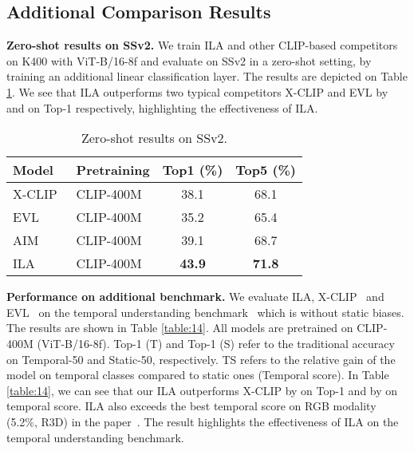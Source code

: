 \documentclass[10pt,twocolumn,letterpaper]{article}
\begin{document}
\subsection{Additional Comparison Results}

\noindent\textbf{Zero-shot results on SSv2.} We train ILA and other CLIP-based competitors on K400 with ViT-B/16-8f and evaluate on SSv2 in a zero-shot setting, by training an additional linear classification layer. The results are depicted on Table \ref{table:13}. We see that ILA outperforms two typical competitors X-CLIP and EVL by  and  on Top-1 respectively, highlighting the effectiveness of ILA.

\begin{table}[htbp]\small
  \caption{Zero-shot results on SSv2.}
  \begin{center}
  \renewcommand\arraystretch{1.2}
  \begin{tabular}{llcc}
    \toprule
    Model  & Pretraining   & Top1 (\%)      & Top5 (\%)      \\ \midrule
    X-CLIP~\cite{b24} & CLIP-400M & 38.1          & 68.1          \\
    EVL~\cite{b25}    & CLIP-400M    & 35.2          & 65.4          \\
    AIM~\cite{yang2023aim}    & CLIP-400M    & 39.1          & 68.7          \\ 
    ILA    & CLIP-400M    & \textbf{43.9} & \textbf{71.8} \\
    \bottomrule
  \end{tabular}
  \end{center}
  \label{table:13}
  \vspace{-0.2in}
\end{table}

\noindent\textbf{Performance on additional benchmark.} We evaluate ILA, X-CLIP~\cite{b24} and EVL~\cite{b25} on the temporal understanding benchmark~\cite{sevilla2021only} which is without static biases. The results are shown in Table \ref{table:14}. All models are pretrained on CLIP-400M (ViT-B/16-8f). Top-1 (T) and Top-1 (S) refer to the traditional accuracy on Temporal-50 and Static-50, respectively. TS refers to the relative gain of the model on temporal classes compared to static ones (Temporal score). In Table \ref{table:14}, we can see that our ILA outperforms X-CLIP by  on Top-1 and by  on temporal score. ILA also exceeds the best temporal score on RGB modality (5.2\%, R3D) in the paper~\cite{sevilla2021only}. The result highlights the effectiveness of ILA on the temporal understanding benchmark.  
\end{document}
